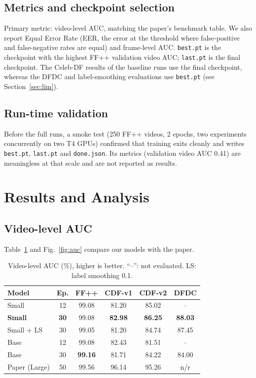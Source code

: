 \documentclass[lettersize,journal]{IEEEtran}
\begin{document}
\subsection{Metrics and checkpoint selection}
Primary metric: video-level AUC, matching the paper's benchmark table. We also report Equal Error Rate (EER, the error at the threshold where false-positive and false-negative rates are equal) and frame-level AUC. \texttt{best.pt} is the checkpoint with the highest FF++ validation video AUC; \texttt{last.pt} is the final checkpoint. The Celeb-DF results of the baseline runs use the final checkpoint, whereas the DFDC and label-smoothing evaluations use \texttt{best.pt} (see Section~\ref{sec:lim}).

\subsection{Run-time validation}
Before the full runs, a smoke test (250 FF++ videos, 2 epochs, two experiments concurrently on two T4 GPUs) confirmed that training exits cleanly and writes \texttt{best.pt}, \texttt{last.pt} and \texttt{done.json}. Its metrics (validation video AUC 0.41) are meaningless at that scale and are not reported as results.

\section{Results and Analysis}
\subsection{Video-level AUC}
Table~\ref{tab:auc} and Fig.~\ref{fig:auc} compare our models with the paper.
\begin{table}[!t]
\caption{Video-level AUC (\%), higher is better. ``--'': not evaluated. LS: label smoothing 0.1.\label{tab:auc}}
\centering
\footnotesize
\setlength{\tabcolsep}{3pt}
\begin{tabular}{|l|c||c|c|c|c|}
\hline
Model & Ep. & FF++ & CDF-v1 & CDF-v2 & DFDC\\
\hline
Small & 12 & 99.08 & 81.20 & 85.02 & --\\
\textbf{Small} & \textbf{30} & 99.08 & \textbf{82.98} & \textbf{86.25} & \textbf{88.03}\\
Small + LS & 30 & 99.05 & 81.20 & 84.74 & 87.45\\
Base & 12 & 99.08 & 82.43 & 81.51 & --\\
Base & 30 & \textbf{99.16} & 81.71 & 84.22 & 84.00\\
\hline
Paper (Large) & 50 & 99.56 & 96.14 & 95.26 & n/r\\
\hline
\end{tabular}
\end{table}
\end{document}
